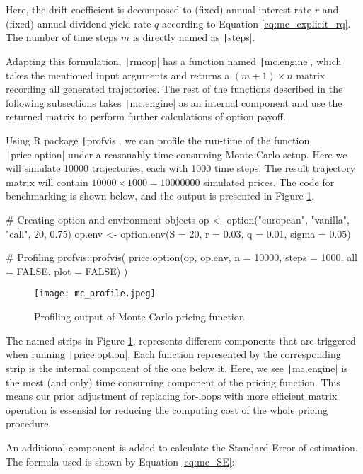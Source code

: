 Here, the drift coefficient is decomposed to (fixed) annual interest rate $r$ and (fixed) annual dividend yield rate $q$ according to Equation \ref{eq:mc_explicit_rq}. The number of time steps $m$ is directly named as \texttt|steps|.

Adapting this formulation, \texttt|rmcop| has a function named \texttt|mc.engine|, which takes the mentioned input arguments and returns a $(m+1)\times n$ matrix recording all generated trajectories. The rest of the functions described in the following subsections takes \texttt|mc.engine| as an internal component and use the returned matrix to perform further calculations of option payoff.

Using R package \texttt|profvis|, we can profile the run-time of the function \texttt|price.option| under a reasonably time-consuming Monte Carlo setup. Here we will simulate 10000 trajectories, each with 1000 time steps. The result trajectory matrix will contain $10000\times1000=10000000$ simulated prices. The code for benchmarking is shown below, and the output is presented in Figure \ref{img:mc_profile}.

\begin{Rminted}
# Creating option and environment objects
op <- option("european", "vanilla", "call", 20, 0.75)
op.env <- option.env(S = 20, r = 0.03, q = 0.01, sigma = 0.05)

# Profiling
profvis::profvis(
    price.option(op, op.env, n = 10000, steps = 1000, all = FALSE, plot = FALSE)
)
\end{Rminted}

\begin{figure}[H]
	\centering
	\texttt{[image: mc\_profile.jpeg]}
	\caption{Profiling output of Monte Carlo pricing function} \label{img:mc_profile}
\end{figure}

The named strips in Figure \ref{img:mc_profile}, represents different components that are triggered when running \texttt|price.option|. Each function represented by the corresponding strip is the internal component of the one below it. Here, we see \texttt|mc.engine| is the most (and only) time consuming component of the pricing function. This means our prior adjustment of replacing for-loops with more efficient matrix operation is essensial for reducing the computing cost of the whole pricing procedure.

An additional component is added to calculate the Standard Error of estimation. The formula used is shown by Equation \ref{eq:mc_SE}:

